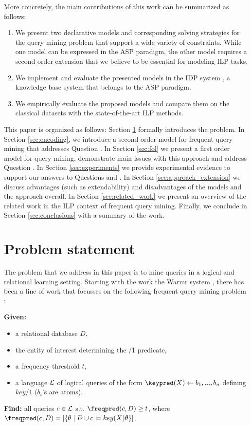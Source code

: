 More concretely, the main contributions of this work can be summarized as follows:
\begin{enumerate}
  \item We present two declarative models and corresponding solving strategies for the query mining problem that support a wide variety of constraints.  While one model can be expressed in the ASP paradigm, the other model requires a  second order extension that we believe
to be essential for modeling ILP tasks. 
  \item We implement and evaluate the presented models in the IDP system \parencite{idp}, a knowledge base system that belongs to the ASP paradigm.
  \item We empirically evaluate the proposed models and compare them on the classical datasets with the state-of-the-art ILP methods.
\end{enumerate}


This paper is organized as follows:
Section \ref{sec:problem} formally introduces the problem. In Section \ref{sec:encoding}, we introduce a second order model for frequent query mining that addresses Question \qone. In Section \ref{sec:fol} we present a first order model for query mining, demonstrate main issues with this approach and address Question \qtwo. In Section \ref{sec:experiments} we provide experimental evidence to support our answers to Questions \qtwo and \qthree. In Section \ref{sec:approach_extension} we discuss advantages (such as extendability) and disadvantages of the models and the approach overall. In Section \ref{sec:related_work} we present an overview of the related work in the ILP context of frequent query mining. Finally, we conclude in Section \ref{sec:conclusions} with a summary of the work. 

\section{Problem statement}\label{sec:problem}

The problem that we address in this paper is to mine queries in a logical and relational learning setting. Starting with the work the Warmr system \parencite{warmr}, there has been a line of work that focusses on the following frequent query mining problem \parencite{bagm,farmer,condensed_luc}:


\noindent
{\bf Given:} \vspace{-8pt}
\begin{itemize}
\item a relational database $D$,
\item the entity of interest determining the \keypred/1 predicate,
\item a frequency threshold $t$,
\item a language ${\cal L}$ of logical queries of the form $\keypred(X) \leftarrow b_1, ..., b_n$ defining $key/1$ ($b_i$'s are atoms).
\end{itemize}\vspace{-5pt}
{\bf Find:} all queries $c \in {\cal L}$ s.t. $\freqpred(c,D) \geq t$, where ${\freqpred(c,D) = |\{\theta \mid D \cup c \models key(X)\theta \}|}$.

